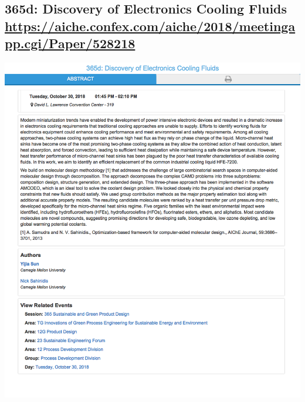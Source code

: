 \documentclass[11pt]{article}
\begin{document}
\subsection{365d: Discovery of Electronics Cooling Fluids \url{https://aiche.confex.com/aiche/2018/meetingapp.cgi/Paper/528218}}
\label{sec:org4a1b969}
\begin{center}
\includegraphics[width=.9\linewidth]{./528218.png}
\end{center}
\end{document}
